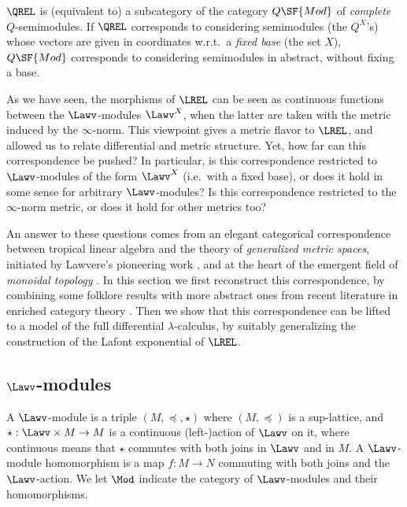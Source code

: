 \begin{remark}
 $\QREL$ is (equivalent to) a subcategory of the category $Q\SF{Mod}$ of \emph{complete} $Q$-semimodules.
 If $\QREL$ corresponds to considering semimodules (the $Q^X$'s) whose vectors are given in coordinates w.r.t.\ a \emph{fixed base} (the set $X$), $Q\SF{Mod}$ corresponds to considering semimodules in abstract, without fixing a base.
\end{remark}

As we have seen, the morphisms of $\LREL$ can be seen as continuous functions between the $\Lawv$-modules $\Lawv^{X}$, when the latter are taken with the metric induced by the $\infty$-norm. This viewpoint gives a metric flavor to $\LREL$, and allowed us to relate differential and metric structure. Yet, how far can this correspondence be pushed?
In particular, is this correspondence restricted to $\Lawv$-modules of the form $\Lawv^{X}$ (i.e.~with a fixed base), or does it hold in some sense for arbitrary $\Lawv$-modules? Is this correspondence restricted to the $\infty$-norm metric, or does it hold for other metrics too?

An answer to these questions comes from an elegant categorical correspondence between tropical linear algebra and the theory of \emph{generalized metric spaces}, initiated by Lawvere's pioneering work \cite{Lawvere1973}, and at the heart of the emergent field of \emph{monoidal topology} \cite{Hofmann2014, Stubbe2014}. 
In this section we first reconstruct this correspondence, by combining some {folklore} results with more abstract ones from recent literature in enriched category theory \cite{Fuji, Stubbe2006, Shen2014}. Then we show that this correspondence can be lifted to a model of the full differential $\lambda$-calculus, by suitably generalizing the construction of the Lafont exponential of $\LREL$.

%
%

\subsection{$\Lawv$-modules}


A $\Lawv$-module is a triple $(M,\preceq, \star)$ where $(M, \preceq)$ is a sup-lattice, and $\star: \Lawv \times M \to M$ is a continuous (left-)action of $\Lawv$ on it, where continuous means that $\star$ commutes with both joins in $\Lawv$ and in $M$.%
A $\Lawv$-module homomorphism is a map $f:M\to N$ commuting with both joins and the $\Lawv$-action. We let $\Mod$ indicate the category of $\Lawv$-modules and their homomorphisms. 
 
